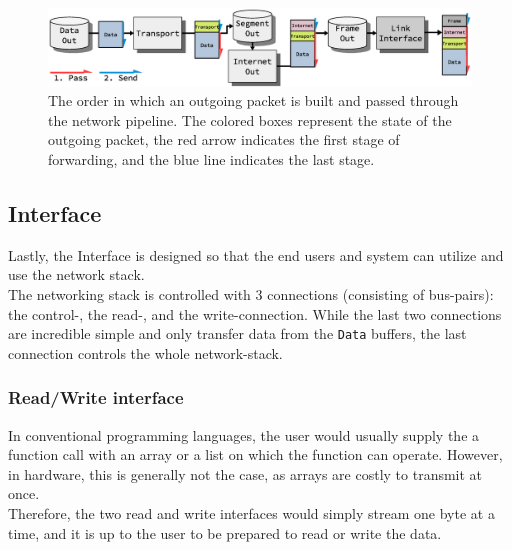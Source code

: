 \begin{figure}
    \centering
    \includegraphics[scale=0.45]{design/sending_packet_graph.eps}
    \caption{The order in which an outgoing packet is built and passed through the network pipeline.
    The colored boxes represent the state of the outgoing packet, the red arrow
    indicates the first stage of forwarding, and the blue line indicates the last stage.}
    \label{fig:sending_packet_graph}
\end{figure}



\subsection{Interface}
Lastly, the Interface is designed so that the end users and system can utilize
and use the network stack.\\
The networking stack is controlled with 3 connections (consisting of bus-pairs):
the control-, the read-, and the write-connection. While the last two connections
are incredible simple and only transfer data from the \texttt{Data} buffers,
the last connection controls the whole network-stack.

\subsubsection{Read/Write interface}
In conventional programming languages, the user would usually supply the a
function call with an array or a list on which the function can operate.
However, in hardware, this is generally not the case, as arrays are costly to
transmit at once.\\
Therefore, the two read and write interfaces would simply stream one byte at a
time, and it is up to the user to be prepared to read or write the data.


